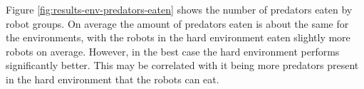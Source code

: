 \vspace*{\fill}
\newpage
\vspace*{\fill}


Figure \ref{fig:results-env-predators-eaten} shows the number of predators eaten by robot groups.
On average the amount of predators eaten is about the same for the environments, with the robots in the hard environment eaten slightly more robots on average.
However, in the best case the hard environment performs significantly better. 
This may be correlated with it being more predators present in the hard environment that the robots can eat.
\vspace*{\fill}
